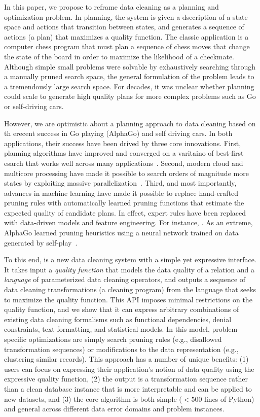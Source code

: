 In this paper, we propose to reframe data cleaning as a planning and optimization problem.  In planning, the system is given a dsecription of a state space and actions that transition between states, and generates a sequence of actions (a plan) that maximizes a quality function. The classic application is a computer chess program that must plan a sequence of chess moves that change the state of the board in order to maximize the likelihood of a checkmate. Although simple small problems were solvable by exhaustively searching through a manually pruned search space, the general formulation of the problem leads to a tremendously large search space.  For decades, it was unclear whether planning could scale to generate high quality plans for more complex problems such as Go or self-driving cars.

However, we are optimistic about a planning approach to data cleaning based on th erecent success in Go playing (AlphaGo) and self driving cars.  In both applications, their success have been drived by three core innovations.  First, planning algorithms have improved and converged on a varitaino of best-first esarch that works well across many applications~\cite{}.  Second, modern cloud and multicore processing have made it possible to search orders of magnitude more states by exploiting massive parallelization~\cite{}.  Third, and most importantly, advances in machine learning have made it possible to replace hand-crafted pruning rules with automatically learned pruning functions that estimate the expected quality of candidate plans.  In effect, expert rules have been replaced with data-driven models and feature engineering.  For instance, .  As an extreme, AlphaGo learned pruning heuristics using a neural network trained on data generated by self-play~\cite{alphago}.   

To this end, \sys is a new data cleaning system with a simple yet expressive interface.  It takes input a {\it quality function} that models the data quality of a relation and a {\it language} of parameterized data cleaning operators, and outputs a sequence of data cleaning transformations (a cleaning program) from the language that seeks to maximize the quality function.  This API imposes minimal restrictions on the quality function, and we show that it can express arbitrary combinations of existing data cleaning formalisms such as functional dependencies, denial constraints, text formatting, and statistical models.  In this model, problem-specific optimizations are simply search pruning rules (e.g., disallowed transformation sequences) or modifications to the data representation (e.g., clustering similar records).  This approach has a number of unique benefits: (1) users can focus on expressing their application's notion of data quality using the expressive quality function, (2) the output is a transformation sequence rather than a clean database instance that is more interpretable and can be applied to new datasets, and (3) the core algorithm is both simple  ($<500$ lines of Python) and general across different data error domains and problem instances.

